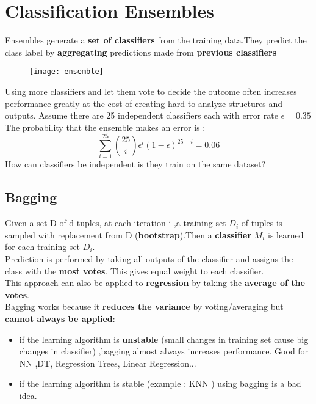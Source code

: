 \section{Classification Ensembles}

Ensembles generate a \textbf{set of classifiers} from the training data.They predict the class label by \textbf{aggregating} predictions made from \textbf{previous classifiers}
\begin{figure}[H]
  \centering
  \texttt{[image: ensemble]}
\end{figure}
Using more classifiers and let them vote to decide the outcome often increases performance greatly at the cost of creating hard to analyze structures and outputs.
Assume there are 25 independent classifiers each with error rate $\epsilon= 0.35$
The probability that the ensemble makes an error is :
$$ \sum \limits_{i=1}^{25} \binom{25}{i}\epsilon^i(1-\epsilon)^{25-i}= 0.06$$
How can classifiers be independent is they train on the same dataset?

\subsection{Bagging}
Given a set D of d tuples, at each iteration i ,a training set $D_i$ of tuples is sampled with replacement from D (\textbf{bootstrap}).Then a \textbf{classifier} $M_i$ is learned for each training set $D_i$.\\
Prediction is performed by taking all outputs of the classifier and assigns the class with the \textbf{most votes}. This gives equal weight to each classifier.\\
This approach can also be applied to \textbf{regression} by taking the \textbf{average of the votes}.\\
Bagging works because it \textbf{reduces the variance} by voting/averaging but  \textbf{cannot always be applied}:
\begin{itemize}
\item if the learning algorithm is \textbf{unstable} (small changes in training set cause big changes in classifier) ,bagging almost always increases performance. 
Good for NN ,DT, Regression Trees, Linear Regression...
\item if the learning algorithm is stable (example : KNN ) using bagging is a bad idea.
\end{itemize}

